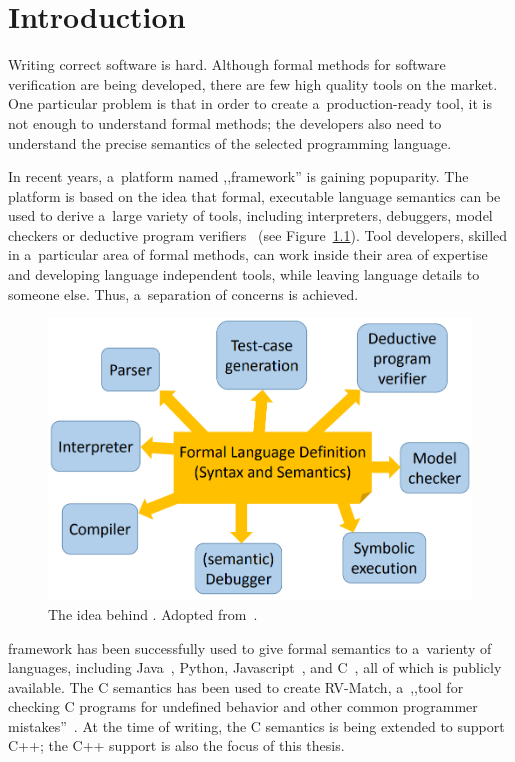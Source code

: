 \documentclass{fithesis3}
\begin{document}
\chapter{Introduction}

Writing correct software is hard.
Although formal methods for software verification are being developed, there are few high quality tools on the market. One particular problem is that in order to create a~production-ready tool, it is not enough to understand formal methods; the developers also need to understand the precise semantics of the selected programming language.

In recent years, a~platform named ,,\K framework'' is gaining popuparity. The platform is based on the idea that formal, executable language semantics can be used to derive a~large variety of tools, including interpreters, debuggers, model checkers or deductive program verifiers~\cite{rosu-2017-marktoberdorf} (see Figure~\ref{kidea}). Tool developers, skilled in a~particular area of formal methods, can work inside their area of expertise and developing language independent tools, while leaving language details to someone else. Thus, a~separation of concerns is achieved.

\begin{figure}[h]
\centering
\includegraphics[width=0.7\linewidth]{img/kidea.png}
\caption{The idea behind \K. Adopted from~\cite{rosu-2015-meseguer}.}
\label{kidea}
\end{figure}

\K framework has been successfully used to give formal semantics to a~varienty of languages, including Java~\cite{bogdanas-rosu-2015-popl}, Python, Javascript~\cite{park-stefanescu-rosu-2015-pldi}, and C~\cite{ellison-2012-thesis,hathhorn-ellison-rosu-2015-pldi}, all of which is publicly available. The C semantics has been used to create RV-Match, a~,,tool for checking C programs for
undefined behavior and other common programmer mistakes''~\cite{guth-hathhorn-saxena-rosu-2016-cav}.  At the time of writing, the C semantics is being extended to support C++; the C++ support is also the focus of this thesis.
\end{document}
